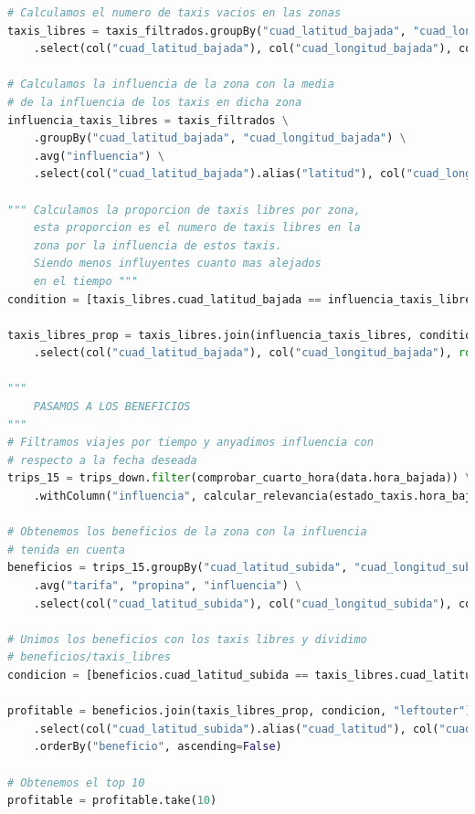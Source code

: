 \begin{lstlisting}[label=codProfDay,language=Python,frame=single,caption=Código de la consulta para obtener las diez zonas que proporcionan más beneficios al taxista teniendo en cuenta la estacionalidad]
# Calculamos el numero de taxis vacios en las zonas
taxis_libres = taxis_filtrados.groupBy("cuad_latitud_bajada", "cuad_longitud_bajada").count() \
    .select(col("cuad_latitud_bajada"), col("cuad_longitud_bajada"), col("count").alias("taxis_libres"))

# Calculamos la influencia de la zona con la media
# de la influencia de los taxis en dicha zona
influencia_taxis_libres = taxis_filtrados \
    .groupBy("cuad_latitud_bajada", "cuad_longitud_bajada") \
    .avg("influencia") \
    .select(col("cuad_latitud_bajada").alias("latitud"), col("cuad_longitud_bajada").alias("longitud"), col("avg(influencia)").alias("influencia"))

""" Calculamos la proporcion de taxis libres por zona, 
    esta proporcion es el numero de taxis libres en la 
    zona por la influencia de estos taxis.
    Siendo menos influyentes cuanto mas alejados
    en el tiempo """
condition = [taxis_libres.cuad_latitud_bajada == influencia_taxis_libres.latitud, taxis_libres.cuad_longitud_bajada == influencia_taxis_libres.longitud]

taxis_libres_prop = taxis_libres.join(influencia_taxis_libres, condition) \
    .select(col("cuad_latitud_bajada"), col("cuad_longitud_bajada"), round(col("taxis_libres") * col("influencia")).alias("proporcion_taxis_libres"))

"""
    PASAMOS A LOS BENEFICIOS
"""
# Filtramos viajes por tiempo y anyadimos influencia con
# respecto a la fecha deseada
trips_15 = trips_down.filter(comprobar_cuarto_hora(data.hora_bajada)) \
    .withColumn("influencia", calcular_relevancia(estado_taxis.hora_bajada))

# Obtenemos los beneficios de la zona con la influencia
# tenida en cuenta
beneficios = trips_15.groupBy("cuad_latitud_subida", "cuad_longitud_subida") \
    .avg("tarifa", "propina", "influencia") \
    .select(col("cuad_latitud_subida"), col("cuad_longitud_subida"), col("avg(tarifa)") + col("avg(propina)")) * col("avg(influencia)")).alias("beneficios"))

# Unimos los beneficios con los taxis libres y dividimo
# beneficios/taxis_libres
condicion = [beneficios.cuad_latitud_subida == taxis_libres.cuad_latitud_bajada, beneficios.cuad_longitud_subida == taxis_libres.cuad_longitud_bajada]

profitable = beneficios.join(taxis_libres_prop, condicion, "leftouter") \
    .select(col("cuad_latitud_subida").alias("cuad_latitud"), col("cuad_longitud_subida").alias("cuad_longitud"), col("beneficios") / col("proporcion_taxis_libres")).alias("beneficio")) \
    .orderBy("beneficio", ascending=False)

# Obtenemos el top 10
profitable = profitable.take(10)
\end{lstlisting}
